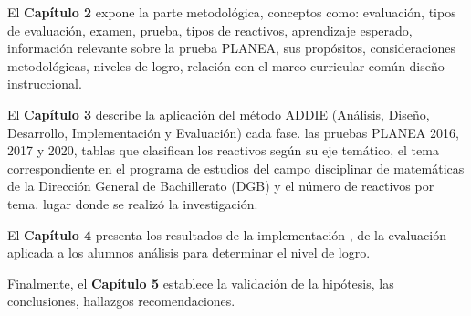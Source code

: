 \noindent El \textbf{Capítulo 2} expone la parte metodológica,  conceptos como: evaluación, tipos de evaluación, examen, prueba, tipos de reactivos, aprendizaje esperado,  información relevante sobre la prueba PLANEA, sus propósitos, consideraciones metodológicas, niveles de logro,  relación con el marco curricular común  diseño instruccional.

\noindent El \textbf{Capítulo 3} describe la aplicación del método ADDIE (Análisis, Diseño, Desarrollo, Implementación y Evaluación)  cada fase.  las pruebas PLANEA 2016, 2017 y 2020,  tablas que clasifican los reactivos según su eje temático, el tema correspondiente en el programa de estudios del campo disciplinar de matemáticas de la Dirección General de Bachillerato (DGB) y el número de reactivos por tema.  lugar donde se realizó la investigación.

\noindent El \textbf{Capítulo 4} presenta los resultados de la implementación ,  de la evaluación aplicada a los alumnos  análisis para determinar el nivel de logro.

\noindent Finalmente, el \textbf{Capítulo 5} establece la validación de la hipótesis, las conclusiones, hallazgos  recomendaciones.